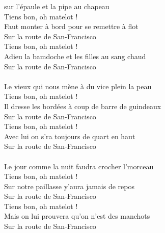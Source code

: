 
 sur l'épaule et la pipe au chapeau
\\Tiens bon, oh matelot !
\\Faut monter à bord pour se remettre à flot
\\Sur la route de San-Francisco \bissimple 
\\Tiens bon, oh matelot !
\\Adieu la bamdoche et les filles au sang chaud
\\Sur la route de San-Francisco \bissimple 
\\\\Le vieux qui nous mène à du vice plein la peau
\\Tiens bon, oh matelot !
\\Il dresse les bordées à coup de barre de guindeaux
\\Sur la route de San-Francisco \bissimple 
\\Tiens bon, oh matelot !
\\Avec lui on s'ra toujours de quart en haut
\\Sur la route de San-Francisco \bissimple 
\\\\Le jour comme la nuit faudra crocher l'morceau
\\Tiens bon, oh matelot !
\\Sur notre paillasse y'aura jamais de repos
\\Sur la route de San-Francisco \bissimple 
\\Tiens bon, oh matelot !
\\Mais on lui prouvera qu'on n'est des manchots
\\Sur la route de San-Francisco \bissimple 

\breakpage